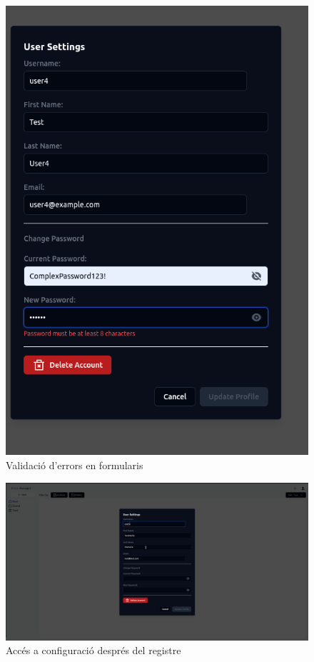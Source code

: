 \begin{figure}[H]
\centering
\includegraphics[width=0.8\linewidth]{Figures/implementacio/userSettingsFormError.png}
\caption{Validació d'errors en formularis}
\label{fig:userSettingsFormError}
\end{figure}

\begin{figure}[H]
\centering
\includegraphics[width=0.8\linewidth]{Figures/implementacio/signupSuccessUserSettings.png}
\caption{Accés a configuració després del registre}
\label{fig:signupSuccessUserSettings}
\end{figure}

